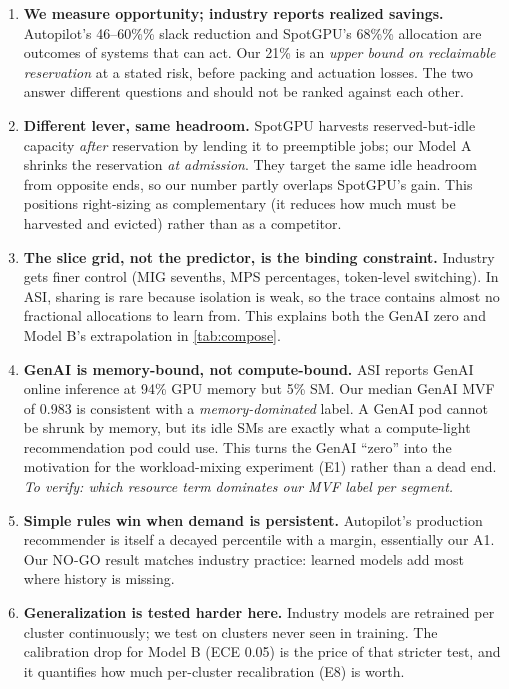 \begin{enumerate}
  \item \textbf{We measure opportunity; industry reports realized savings.} Autopilot's 46--60\%\% slack reduction and SpotGPU's 68\%\% allocation are outcomes of systems that can act. Our 21\% is an \emph{upper bound on reclaimable reservation} at a stated risk, before packing and actuation losses. The two answer different questions and should not be ranked against each other.
  \item \textbf{Different lever, same headroom.} SpotGPU harvests reserved-but-idle capacity \emph{after} reservation by lending it to preemptible jobs; our Model A shrinks the reservation \emph{at admission}. They target the same idle headroom from opposite ends, so our number partly overlaps SpotGPU's gain. This positions right-sizing as complementary (it reduces how much must be harvested and evicted) rather than as a competitor.
  \item \textbf{The slice grid, not the predictor, is the binding constraint.} Industry gets finer control (MIG sevenths, MPS percentages, token-level switching). In ASI, sharing is rare because isolation is weak, so the trace contains almost no fractional allocations to learn from. This explains both the GenAI zero and Model B's extrapolation in \cref{tab:compose}.
  \item \textbf{GenAI is memory-bound, not compute-bound.} ASI reports GenAI online inference at 94\% GPU memory but 5\% SM. Our median GenAI MVF of 0.983 is consistent with a \emph{memory-dominated} label. A GenAI pod cannot be shrunk by memory, but its idle SMs are exactly what a compute-light recommendation pod could use. This turns the GenAI ``zero'' into the motivation for the workload-mixing experiment (E1) rather than a dead end. \emph{To verify: which resource term dominates our MVF label per segment.}
  \item \textbf{Simple rules win when demand is persistent.} Autopilot's production recommender is itself a decayed percentile with a margin, essentially our A1. Our NO-GO result matches industry practice: learned models add most where history is missing.
  \item \textbf{Generalization is tested harder here.} Industry models are retrained per cluster continuously; we test on clusters never seen in training. The calibration drop for Model B (ECE 0.05) is the price of that stricter test, and it quantifies how much per-cluster recalibration (E8) is worth.
\end{enumerate}


